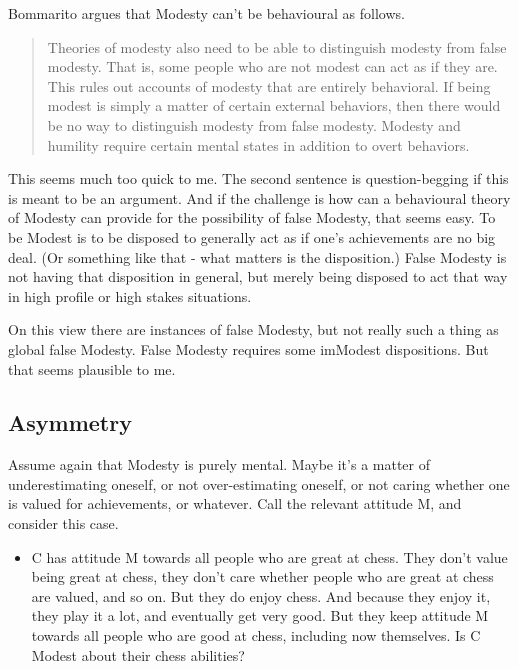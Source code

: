 \documentclass[
]{article}
\providecommand{\tightlist}{%
  \setlength{\itemsep}{0pt}\setlength{\parskip}{0pt}}
\begin{document}
Bommarito argues that Modesty can't be behavioural as follows.

\begin{quote}
Theories of modesty also need to be able to distinguish modesty from
false modesty. That is, some people who are not modest can act as if
they are. This rules out accounts of modesty that are entirely
behavioral. If being modest is simply a matter of certain external
behaviors, then there would be no way to distinguish modesty from false
modesty. Modesty and humility require certain mental states in addition
to overt behaviors.
\end{quote}

This seems much too quick to me. The second sentence is question-begging
if this is meant to be an argument. And if the challenge is how can a
behavioural theory of Modesty can provide for the possibility of false
Modesty, that seems easy. To be Modest is to be disposed to generally
act as if one's achievements are no big deal. (Or something like that -
what matters is the disposition.) False Modesty is not having that
disposition in general, but merely being disposed to act that way in
high profile or high stakes situations.

On this view there are instances of false Modesty, but not really such a
thing as global false Modesty. False Modesty requires some imModest
dispositions. But that seems plausible to me.

\hypertarget{asymmetry}{%
\subsection{Asymmetry}\label{asymmetry}}

Assume again that Modesty is purely mental. Maybe it's a matter of
underestimating oneself, or not over-estimating oneself, or not caring
whether one is valued for achievements, or whatever. Call the relevant
attitude M, and consider this case.

\begin{itemize}
\tightlist
\item
  C has attitude M towards all people who are great at chess. They don't
  value being great at chess, they don't care whether people who are
  great at chess are valued, and so on. But they do enjoy chess. And
  because they enjoy it, they play it a lot, and eventually get very
  good. But they keep attitude M towards all people who are good at
  chess, including now themselves. Is C Modest about their chess
  abilities?
\end{itemize}
\end{document}
